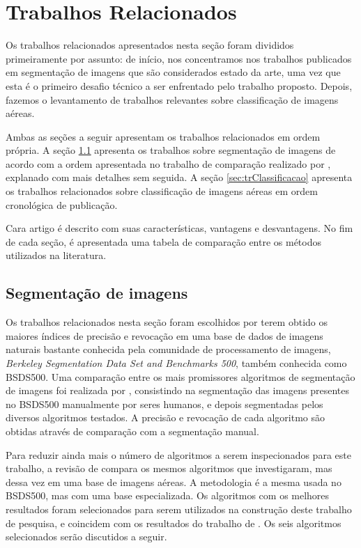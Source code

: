 \chapter{Trabalhos Relacionados}


Os trabalhos relacionados apresentados nesta seção foram divididos primeiramente por assunto: de início, nos concentramos nos trabalhos publicados em segmentação de imagens que são considerados estado da arte, uma vez que esta é o primeiro desafio técnico a ser enfrentado pelo trabalho proposto. Depois, fazemos o levantamento de trabalhos relevantes sobre classificação de imagens aéreas.

Ambas as seções a seguir apresentam os trabalhos relacionados em ordem própria. A seção \ref{sec:trSegmentacao} apresenta os trabalhos sobre segmentação de imagens de acordo com a ordem apresentada no trabalho de comparação realizado por , explanado com mais detalhes sem seguida. A seção \ref{sec:trClassificacao} apresenta os trabalhos relacionados sobre classificação de imagens aéreas em ordem cronológica de publicação.

Cara artigo é descrito com suas características, vantagens e desvantagens. No fim de cada seção, é apresentada uma tabela de comparação entre os métodos utilizados na literatura.

\section{Segmentação de imagens}\label{sec:trSegmentacao}


Os trabalhos relacionados nesta seção foram escolhidos por terem obtido os maiores índices de precisão e revocação em uma base de dados de imagens naturais bastante conhecida pela comunidade de processamento de imagens, \textit{Berkeley Segmentation Data Set and Benchmarks 500}, também conhecida como BSDS500. Uma comparação entre os mais promissores algoritmos de segmentação de imagens foi realizada por , consistindo na segmentação das imagens presentes no BSDS500 manualmente por seres humanos, e depois segmentadas pelos diversos algoritmos testados. A precisão e revocação de cada algoritmo são obtidas através de comparação com a segmentação manual.

Para reduzir ainda mais o número de algoritmos a serem inspecionados para este trabalho, a revisão de  compara os mesmos algoritmos que  investigaram, mas dessa vez em uma base de imagens aéreas. A metodologia é a mesma usada no BSDS500, mas com uma base especializada. Os algoritmos com os melhores resultados foram selecionados para serem utilizados na construção deste trabalho de pesquisa, e coincidem com os resultados do trabalho de . Os seis algoritmos selecionados serão discutidos a seguir.

